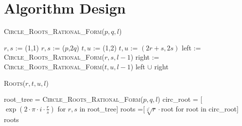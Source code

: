 \documentclass[sigconf]{acmart}
\begin{document}
\section{Algorithm Design}


\begin{algorithm}
   \caption{\textsc{Circle\_Roots\_Rational\_Form}($p,q,l$)}
   \label{alg:circ_roots_rational_form}
\begin{algorithmic}
  \STATE  $r, s$ := (1,1)
\ELSE
  \STATE  $r, s$ := ($p$,$2q$)
\ENDIF
    \STATE $t, u$ := (1,2)
  \ELSE
    \STATE $t, u$ := $(2r+s, 2s)$
  \ENDIF
		  \RETURN [($r,s$),($t,u$)]
		\STATE left  := \textsc{Circle\_Roots\_Rational\_Form}($r,s,l-1$)
		\STATE right := \textsc{Circle\_Roots\_Rational\_Form}($t,u,l-1$)
		\RETURN left $\cup$ right
	\ELSE
		\RETURN  [($p,q$)]
      \ENDIF
\end{algorithmic}
\end{algorithm}

\begin{algorithm}
\caption{\textsc{Roots}($r,t,u,l$)}
\label{alg:roots}
\begin{algorithmic}
\STATE root\_tree = \textsc{Circle\_Roots\_Rational\_Form}($p,q,l$)
\STATE circ\_root = [$\exp\left(2\cdot\pi\cdot i \cdot \frac{r}{s}\right)$ for $r,s$ in root\_tree]
\STATE roots =[$\sqrt[2^l]{r}\cdot$root for root in circ\_root]
\RETURN roots
\end{algorithmic}
\end{algorithm}




%
%
\end{document}
